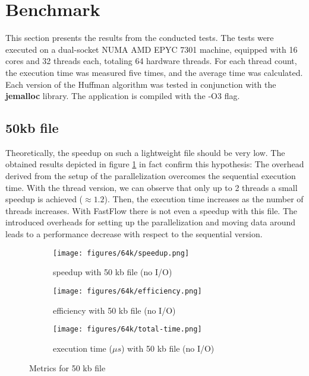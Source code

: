 \documentclass{article}
\begin{document}
\section{Benchmark}
This section presents the results from the conducted tests. The tests were executed on a dual-socket NUMA
AMD EPYC 7301 machine, equipped with 16 cores and 32 threads each, totaling 64 hardware threads.
For each thread count, the execution time was measured five times, and the average time was calculated.
Each version of the Huffman algorithm was tested in conjunction with the \textbf{jemalloc} library.
The application is compiled with the -O3 flag.
\subsection{50kb file}
Theoretically, the speedup on such a lightweight file should be very low.
The obtained results depicted in figure \ref{fig:50kb} in fact confirm this hypothesis: The overhead derived
from the setup of the parallelization overcomes the sequential execution time.
With the thread version, we can observe that only up to 2 threads a small speedup is achieved ($\approx 1.2$).
Then, the execution time increases as the number of threads increases.
With FastFlow there is not even a speedup with this file. The introduced overheads
for setting up the parallelization and moving data around leads to a performance decrease
with respect to the sequential version.
\begin{figure}[H]
    \begin{subfigure}{0.6\textwidth}
        \centering
        \texttt{[image: figures/64k/speedup.png]}
        \caption{speedup with 50 kb file (no I/O)}
    \end{subfigure}
    \begin{subfigure}{0.6\textwidth}
        \centering
        \texttt{[image: figures/64k/efficiency.png]}
        \caption{efficiency with 50 kb file (no I/O)}
    \end{subfigure}
    \begin{subfigure}{0.6\textwidth}
        \centering
        \texttt{[image: figures/64k/total-time.png]}
        \caption{execution time ($\mu s$) with 50 kb file (no I/O)}
    \end{subfigure}
    \caption{Metrics for 50 kb file}
    \label{fig:50kb}
\end{figure}
\end{document}
